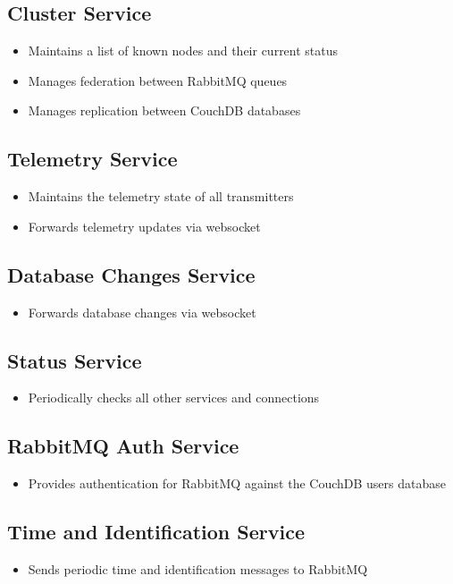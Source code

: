 \subsection{Cluster Service}
\begin{itemize}
\item Maintains a list of known nodes and their current status
\item Manages federation between RabbitMQ queues
\item Manages replication between CouchDB databases
\end{itemize}

\subsection{Telemetry Service}
\begin{itemize}
\item Maintains the telemetry state of all transmitters
\item Forwards telemetry updates via websocket
\end{itemize}

\subsection{Database Changes Service}
\begin{itemize}
\item Forwards database changes via websocket
\end{itemize}

\subsection{Status Service}
\begin{itemize}
\item Periodically checks all other services and connections
\end{itemize}

\subsection{RabbitMQ Auth Service}
\begin{itemize}
\item Provides authentication for RabbitMQ against the CouchDB users database
\end{itemize}

\subsection{Time and Identification Service}
\begin{itemize}
\item Sends periodic time and identification messages to RabbitMQ
\end{itemize}

